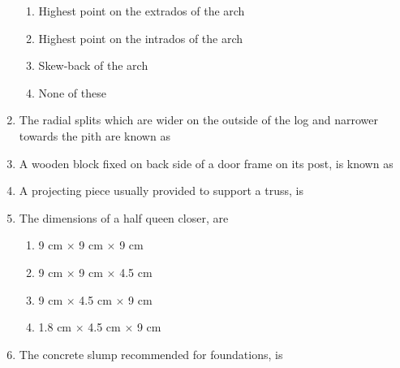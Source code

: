 \documentclass[11pt,a4paper]{article}
\begin{document}
\begin{enumerate}
\begin{enumerate}[label=\Alph*.]
\item{Highest point on the extrados of the arch}
\item{Highest point on the intrados of the arch}
\item{Skew-back of the arch}
\item{None of these}
\end{enumerate}
\item{The radial splits which are wider on the outside of the log and narrower towards the pith are known as}
\\
\item{A wooden block fixed on back side of a door frame on its post, is known as}
\\
\item{A projecting piece usually provided to support a truss, is}
\\
\item{The dimensions of a half queen closer, are}
\begin{enumerate}[label=\Alph*.]
\item{9 cm $\times$ 9 cm $\times$ 9 cm}
\item{9 cm $\times$ 9 cm $\times$ 4.5 cm}
\item{9 cm $\times$ 4.5 cm $\times$ 9 cm}
\item{1.8 cm $\times$ 4.5 cm $\times$ 9 cm}
\end{enumerate}
\item{The concrete slump recommended for foundations, is}

\end{enumerate}
\end{document}
